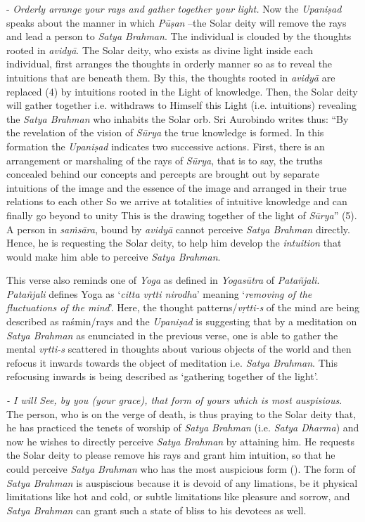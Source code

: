 - \emph{Orderly arrange your rays and gather together your light.} Now the \emph{Upaniṣad} speaks about the manner in which \emph{Pūṣan} --the Solar deity will remove the rays and lead a person to \emph{Satya Brahman}. The individual is clouded by the thoughts rooted in \emph{avidyā}. The Solar deity, who exists as divine light inside each individual, first arranges the thoughts in orderly manner so as to reveal the intuitions that are beneath them. By this, the thoughts rooted in \emph{avidyā} are replaced (4) by intuitions rooted in the Light of knowledge. Then, the Solar deity will gather together i.e. withdraws to Himself this Light (i.e. intuitions) revealing the \emph{Satya Brahman} who inhabits the Solar orb. Sri Aurobindo writes thus: ``By the revelation of the vision of \emph{Sūrya} the true knowledge is formed. In this formation the \emph{Upaniṣad} indicates two successive actions. First, there is an arrangement or marshaling of the rays of \emph{Sūrya}, that is to say, the truths concealed behind our concepts and percepts are brought out by separate intuitions of the image and the essence of the image and arranged in their true relations to each other So we arrive at totalities of intuitive knowledge and can finally go beyond to unity This is the drawing together of the light of \emph{Sūrya}'' (5). A person in \emph{saṁsāra}, bound by \emph{avidyā} cannot perceive \emph{Satya Brahman} directly. Hence, he is requesting the Solar deity, to help him develop the \emph{intuition} that would make him able to perceive \emph{Satya Brahman}.

This verse also reminds one of \emph{Yoga} as defined in \emph{Yogasūtra} of \emph{Patañjali}. \emph{Patañjali} defines Yoga as `\emph{citta vṛtti nirodha}' meaning `\emph{removing of the fluctuations of the mind}'. Here, the thought patterns/\emph{vṛtti-s} of the mind are being described as raśmin/rays and the \emph{Upaniṣad} is suggesting that by a meditation on \emph{Satya Brahman} as enunciated in the previous verse, one is able to gather the mental \emph{vṛtti-s} scattered in thoughts about various objects of the world and then refocus it inwards towards the object of meditation i.e. \emph{Satya Brahman}. This refocusing inwards is being described as `gathering together of the light'.

\emph{- I will See, by you (your grace), that form of yours which is most auspisious}. The person, who is on the verge of death, is thus praying to the Solar deity that, he has practiced the tenets of worship of \emph{Satya Brahman} (i.e. \emph{Satya Dharma}) and now he wishes to directly perceive \emph{Satya Brahman} by attaining him. He requests the Solar deity to please remove his rays and grant him intuition, so that he could perceive \emph{Satya Brahman} who has the most auspicious form (). The form of \emph{Satya Brahman} is auspiscious because it is devoid of any limations, be it physical limitations like hot and cold, or subtle limitations like pleasure and sorrow, and \emph{Satya Brahman} can grant such a state of bliss to his devotees as well.

